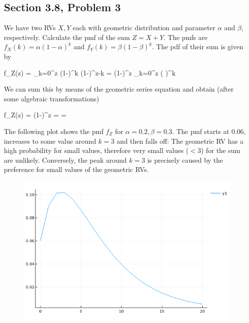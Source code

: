 
\subsection{Section 3.8, Problem 3}

We have two RVs $X, Y$ each with geometric distribution and parameter $\alpha$ and $\beta$, respectively. Calculate the pmf of the sum $Z = X+Y$. The pmfs are $f_X(k) = \alpha(1-\alpha)^k$ and $f_Y(k) = \beta(1-\beta)^k$. The pdf of their sum is given by

\bee
f_Z(z) = \sum_{k=0}^z \alpha (1-\alpha)^k \beta (1-\beta)^{z-k} = \alpha \beta (1-\beta)^z \sum_{k=0}^z \left( \right)^k
\eee

We can sum this by means of the geometric series equation and obtain (after some algebraic transformations)

\bee
f_Z(z) = \alpha \beta (1-\beta)^z  = \cdots = \frac{\alpha \beta}{\alpha-\beta} 
\eee

The following plot shows the pmf $f_Z$ for $\alpha=0.2, \beta=0.3$. The pmf starts at $0.06$, increases to some value around $k=3$ and then falls off: The geometric RV has a high probability for small values, therefore very small values ($< 3$) for the sum are unlikely. Conversely, the peak around $k=3$ is precisely caused by the preference for small values of the geometric RVs.


\begin{figure}[H]
  \includegraphics[scale=0.6]{images/1000_problems_in_prob_3_1.png}
\end{figure}




